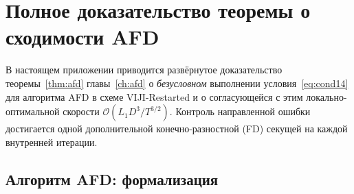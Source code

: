 \chapter{Полное доказательство теоремы о сходимости AFD}\label{app:afd-proof}

В настоящем приложении приводится развёрнутое доказательство
теоремы~\ref{thm:afd} главы~\ref{ch:afd} о
\emph{безусловном} выполнении условия~\eqref{eq:cond14} для алгоритма
AFD в схеме VIJI-Restarted и о согласующейся с этим
локально-оптимальной скорости $\mathcal O(L_1 D^3 / T^{3/2})$. Контроль
направленной ошибки достигается одной дополнительной конечно-разностной
(FD) секущей на каждой внутренней итерации.

\section{Алгоритм AFD: формализация}
\label{sec:app-afd:alg}

